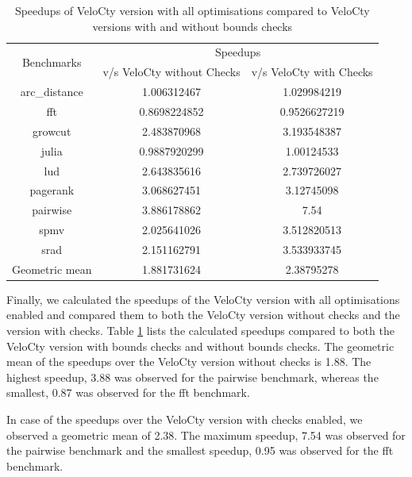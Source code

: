 \begin{table}[htbp]
\centering
\begin{tabular}{|c|c|c|}
\hline
\multirow{2}{*}{Benchmarks} & \multicolumn{2}{c|}{Speedups}                \\ \cline{2-3} 
                            & v/s VeloCty without Checks & v/s VeloCty with Checks \\ \hhline{|=|=|=|}
arc\_distance               & 1.006312467            & 1.029984219         \\ \hline
fft                         & 0.8698224852           & 0.9526627219        \\ \hline
growcut                     & 2.483870968            & 3.193548387         \\ \hline
julia                       & 0.9887920299           & 1.00124533          \\ \hline
lud                         & 2.643835616            & 2.739726027         \\ \hline
pagerank                    & 3.068627451            & 3.12745098          \\ \hline
pairwise                    & 3.886178862            & 7.54                 \\ \hline
spmv                        & 2.025641026            & 3.512820513         \\ \hline
srad                        & 2.151162791            & 3.533933745         \\ \hline
Geometric mean              & 1.881731624            & 2.38795278          \\ \hline
\end{tabular}
\caption{Speedups of VeloCty version with all optimisations compared to VeloCty versions with and without bounds checks}
\label{tab:copvscwopy}
\end{table}

Finally, we calculated the speedups of the VeloCty version with all optimisations enabled and compared them to both the VeloCty version without checks and the version with checks. Table \ref{tab:copvscwopy} lists the calculated speedups compared to both the VeloCty version with bounds checks and without bounds checks. The geometric mean of the speedups over the VeloCty version without checks is 1.88. The highest speedup, 3.88 was observed for the pairwise benchmark, whereas the smallest, 0.87 was observed for the fft benchmark. 

In case of the speedups over the VeloCty version with checks enabled, we observed a geometric mean of 2.38. The maximum speedup, 7.54 was observed for the pairwise benchmark and the smallest speedup, 0.95 was observed for the fft benchmark. 

